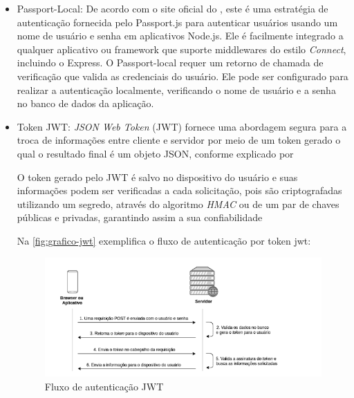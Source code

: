 \begin{itemize}
    \item Passport-Local: De acordo com o site oficial do \cite{passport84}, este é uma estratégia de autenticação fornecida pelo Passport.js para autenticar usuários usando um nome de usuário e senha em aplicativos Node.js. Ele é facilmente integrado a qualquer aplicativo ou framework que suporte middlewares do estilo \textit{Connect}, incluindo o Express. O Passport-local requer um retorno de chamada de verificação que valida as credenciais do usuário. Ele pode ser configurado para realizar a autenticação localmente, verificando o nome de usuário e a senha no banco de dados da aplicação. 
    \item Token JWT: \textit{JSON Web Token} (JWT) fornece uma abordagem segura para a troca de informações entre cliente e servidor por meio de um token gerado o qual o resultado final é um objeto JSON, conforme explicado por  
    \begin{citacao}
        \cite{segurancaeauth} 
        O token gerado pelo JWT é salvo
        no dispositivo do usuário e suas informações podem ser verificadas a cada solicitação,
        pois são criptografadas utilizando um segredo, através do algoritmo \textit{HMAC} ou de um par de chaves públicas e privadas, garantindo assim a sua confiabilidade
    \end{citacao}
    Na \autoref{fig:grafico-jwt} exemplifica o fluxo de autenticação por token jwt: 

\begin{figure}
    \caption{\label{fig:grafico-jwt} Fluxo de autenticação JWT}
    \begin{center}
        \includegraphics[scale=0.6]{imagens/jwt.png}
    \end{center}
\end{figure}
    
\end{itemize}


